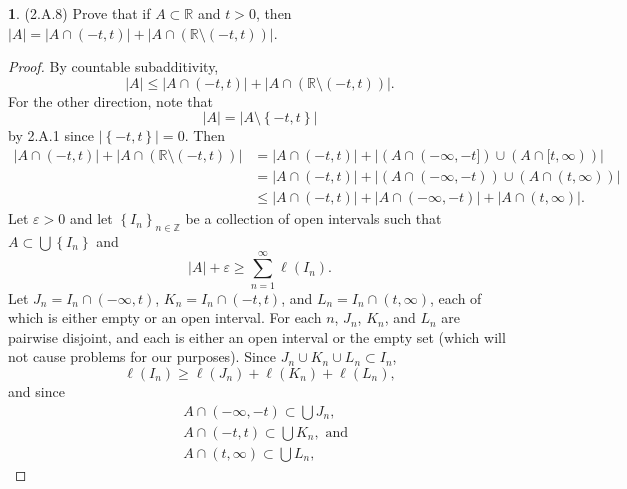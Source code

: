 \documentclass[12pt]{article}
\theoremstyle{definition}
\newtheorem{ex}{}
\begin{document}
\begin{ex}
	(2.A.8)
	Prove that if $A \subset \mathbb{R}$ and $t > 0$, then $|A| = |A \cap (-t, t)| + |A \cap (\mathbb{R} \setminus (-t, t))|$.
\end{ex}
\begin{proof}
	By countable subadditivity, \begin{equation*}
		|A| \leq |A \cap (-t, t)| + |A \cap (\mathbb{R} \setminus (-t, t))|.
	\end{equation*}
	For the other direction, note that \begin{equation*}
		|A| = |A \setminus \left\lbrace -t, t \right\rbrace |
	\end{equation*}
	by 2.A.1 since $|\left\lbrace -t, t \right\rbrace| = 0$.
	Then \begin{align*}
		|A \cap (-t, t)| + |A \cap (\mathbb{R} \setminus (-t, t))| & = |A \cap (-t, t)| + |(A \cap (-\infty, -t]) \cup (A \cap [t, \infty))| \\
		                                                           & = |A \cap (-t, t)| + |(A \cap (-\infty, -t)) \cup (A \cap (t, \infty))| \\
		                                                           & \leq |A \cap(-t, t)| + |A \cap (-\infty, -t)| + |A \cap (t, \infty)|.
	\end{align*}
	Let $\varepsilon > 0$ and let $\left\lbrace I_n \right\rbrace_{n \in \mathbb{Z}}$ be a collection of open intervals such that $A \subset \bigcup \left\lbrace I_n \right\rbrace$ and \begin{equation*}
		|A| + \varepsilon \geq \sum_{n=1}^\infty \ell(I_n).
	\end{equation*}
	Let $J_n = I_n \cap (-\infty, t)$, $K_n = I_n \cap (-t, t)$, and $L_n = I_n \cap (t, \infty)$, each of which is either empty or an open interval.
	For each $n$, $J_n$, $K_n$, and $L_n$ are pairwise disjoint, and each is either an open interval or the empty set (which will not cause problems for our purposes).
	Since $J_n \cup K_n \cup L_n \subset I_n$, \begin{equation*}
		\ell(I_n) \geq \ell(J_n) + \ell(K_n) + \ell(L_n),
	\end{equation*}
	and since \begin{align*}
		 & A \cap (-\infty, -t) \subset \bigcup J_n,       \\
		 & A \cap (-t, t) \subset \bigcup K_n, \text{ and} \\
		 & A \cap (t, \infty) \subset \bigcup L_n,
	\end{align*}

\end{proof}
\end{document}
